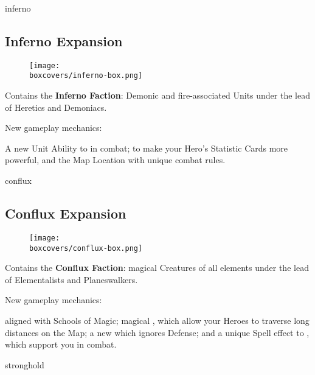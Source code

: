 \begin{multicols}{2}
\begin{expansion}[title=]{inferno}
    \subsection*{\color{inferno}Inferno Expansion}
    \setlength\intextsep{0pt}
    \setlength\columnsep{0.8em}
    \begin{wrapfigure}{l}{0.35\textwidth}
        \texttt{[image: \\boxcovers/inferno-box.png]}
    \end{wrapfigure}
    Contains the \textbf{Inferno Faction}: Demonic and fire-associated Units under the lead of Heretics and Demoniacs.\par
    \medskip
    New gameplay mechanics:\par
    \smallskip
    A new Unit Ability to  in combat;  to make your Hero's Statistic Cards more powerful, and the  Map Location with unique combat rules.
\end{expansion}

\vspace*{1em}
\begin{expansion}[title=]{conflux}
   \subsection*{\color{conflux}Conflux Expansion}
   \setlength\intextsep{0pt}
   \setlength\columnsep{0.8em}
   \begin{wrapfigure}{l}{0.35\textwidth}
       \texttt{[image: \\boxcovers/conflux-box.png]}
   \end{wrapfigure}
   Contains the \textbf{Conflux Faction}: magical Creatures of all elements under the lead of Elementalists and Planeswalkers.\par
   \medskip
   New gameplay mechanics:\par
   \smallskip
    aligned with Schools of Magic; magical , which allow your Heroes to traverse long distances on the Map; a new  which ignores Defense; and a unique Spell effect to , which support you in combat.  %
\end{expansion}
\vspace*{\fill}

\columnbreak
\begin{expansion}[title=]{stronghold}

\end{expansion}
\end{multicols}
